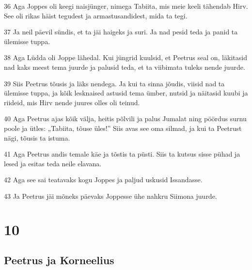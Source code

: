 \par 36 Aga Joppes oli keegi naisjünger, nimega Tabiita, mis meie keeli tähendab Hirv. See oli rikas häist tegudest ja armastusandidest, mida ta tegi.
\par 37 Ja neil päevil sündis, et ta jäi haigeks ja suri. Ja nad pesid teda ja panid ta ülemisse tuppa.
\par 38 Aga Lüdda oli Joppe lähedal. Kui jüngrid kuulsid, et Peetrus seal on, läkitasid nad kaks meest tema juurde ja palusid teda, et ta viibimata tuleks nende juurde.
\par 39 Siis Peetrus tõusis ja läks nendega. Ja kui ta sinna jõudis, viisid nad ta ülemisse tuppa, ja kõik lesknaised astusid tema ümber, nutsid ja näitasid kuubi ja riideid, mis Hirv nende juures olles oli teinud.
\par 40 Aga Peetrus ajas kõik välja, heitis põlvili ja palus Jumalat ning pöördus surnu poole ja ütles: „Tabiita, tõuse üles!” Siis avas see oma silmad, ja kui ta Peetrust nägi, tõusis ta istuma.
\par 41 Aga Peetrus andis temale käe ja tõstis ta püsti. Siis ta kutsus sisse pühad ja lesed ja esitas teda neile elavana.
\par 42 Aga see sai teatavaks kogu Joppes ja paljud uskusid Issandasse.
\par 43 Ja Peetrus jäi mõneks päevaks Joppesse ühe nahkru Siimona juurde.


\chapter{10}

\section*{Peetrus ja Korneelius}

